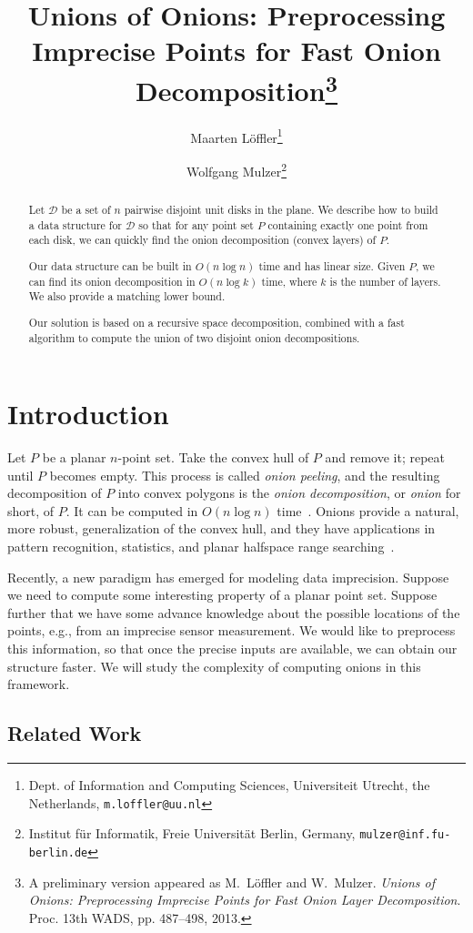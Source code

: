 \documentclass{paper}
\title{Unions of Onions: 
   Preprocessing Imprecise Points for Fast Onion
   Decomposition\thanks{A preliminary version appeared as 
   M.~L\"offler and W.~Mulzer. \emph{Unions of Onions: Preprocessing 
   Imprecise Points for Fast Onion Layer Decomposition}.
   Proc. 13th WADS, pp. 487--498, 2013.}
}
\author
{
  Maarten L\"offler\thanks{
    Dept. of Information and Computing Sciences, 
      Universiteit Utrecht, the Netherlands,
    \texttt{m.loffler@uu.nl}}
   \and Wolfgang Mulzer\thanks{
    Institut f\"ur Informatik, Freie Universit\"at Berlin, Germany, 
    \texttt{mulzer@inf.fu-berlin.de}
    }
}
\newcommand {\script} [1] {\ensuremath {\mathcal {#1}}}
\newcommand {\D} {\script {D}}
\begin{document}
\maketitle

\begin{abstract}
   Let $\D$ be a set of $n$ pairwise disjoint unit disks in the plane.
   We describe how to build a data structure for $\D$ so that
   for any point set $P$ containing
   exactly one point from each disk, we can quickly find the
   onion decomposition (convex layers) of $P$.

   Our data structure can be built in $O(n \log n)$ time
   and has linear size. Given $P$, we can find its 
   onion decomposition in $O(n \log k)$ time, where $k$ is the number of layers.
   We also provide a matching lower bound.
   
   Our solution is based on a recursive space decomposition,
   combined with a fast algorithm to compute the union of two disjoint onion 
   decompositions.
\end{abstract}


\section {Introduction}

Let $P$ be a planar $n$-point set. Take the convex hull of $P$ and remove
it; repeat until $P$ becomes empty.
This process is called \emph{onion peeling}, and the resulting
decomposition of $P$ into convex polygons is the
\emph{onion decomposition}, or \emph {onion} for short, of $P$.
It can be computed in $O(n \log n)$ time~\cite {c-clps-85}.
Onions provide a natural, more robust, generalization of the convex hull,
and they have applications in pattern recognition, statistics, and 
planar halfspace range searching~\cite{cgl-tpogd-85,h-rsar-72,sf-clntrpdps-99}.

Recently, a new paradigm has emerged for modeling data
imprecision.
Suppose we need to compute some interesting property of
a planar point set. Suppose further that we have some advance
knowledge about the possible locations of the points, e.g.,
from an imprecise sensor measurement. We would like to preprocess
this information, so that once the precise inputs are available,
we can obtain our structure faster.
We will study  the complexity of computing onions
in this framework.

\subsection{Related Work}
\end{document}
